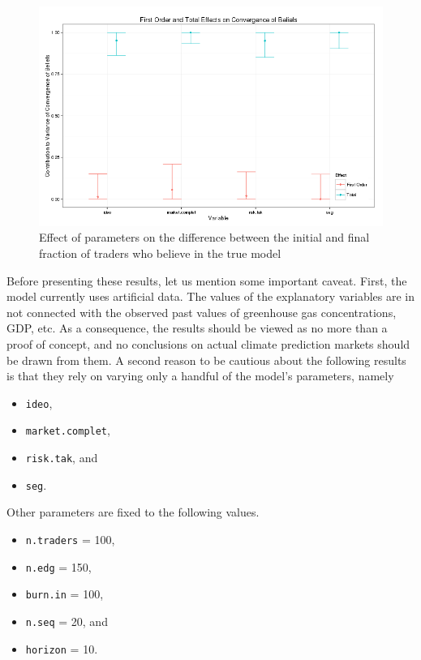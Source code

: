 \documentclass{sig-alternate}
\begin{document}
	\begin{figure}
		\begin{center}
			\includegraphics[scale = 0.5]{sobol_sa.png}
			\caption{ Effect of parameters on the difference between the initial and final fraction of traders who believe in the true model \label{nondirect}}
		\end{center}
	\end{figure}

Before presenting these results, let us mention some important caveat. First, the model currently uses artificial data. The values of the explanatory variables are in not connected with the observed past values of greenhouse gas concentrations, GDP, etc. As a consequence, the results should be viewed as no more than a proof of concept, and no conclusions on actual {climate} prediction markets should be drawn from them. A second reason to be cautious about the following results is that they rely on varying only a handful of the model's parameters, namely
\begin{itemize}
	\item \texttt{ideo}, 
	\item \texttt{market.complet}, 
	\item \texttt{risk.tak}, and
	\item  \texttt{seg}.
\end{itemize}

Other parameters are fixed to the following values.

\begin{itemize}
	\item \texttt{n.traders} = 100,
	\item \texttt{n.edg} = 150,
	\item \texttt{burn.in} = 100,
	\item \texttt{n.seq} = 20, and
	\item \texttt{horizon} = 10.
\end{itemize}
\end{document}
